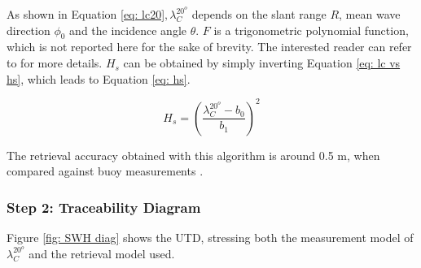 As shown in Equation \ref{eq: lc20}$, \lambda^{20^{o}}_{C}$ depends on the slant range $R$, mean wave direction $\phi_{0}$ and the incidence angle $\theta$. $F$ is a trigonometric polynomial function, which is not reported here for the sake of brevity. The interested reader can refer to \cite{GriecoIJRS2016} for more details. 
$H_{s}$ can be obtained by simply inverting Equation \ref{eq: lc vs hs}, which
leads to Equation \ref{eq: hs}.

\begin{equation}
	H_{s} = \left(\frac{\lambda^{20^{o}}_{C}-b_{0}}{b_{1}}\right)^{2}
	\label{eq: hs}
\end{equation}

The retrieval accuracy obtained with this algorithm is around 0.5 m, when compared against buoy measurements \cite{GriecoIJRS2016}. 

\subsubsection{Step 2: Traceability Diagram}
\label{sec: UTD Hs}

Figure \ref{fig: SWH diag} shows the UTD, stressing both the measurement model of $\lambda_{C}^{20^{o}}$ and the retrieval model used. 

